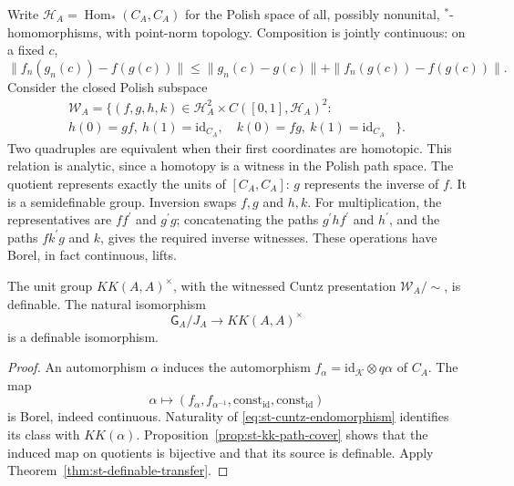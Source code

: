 Write $\mathcal{H}_A=\operatorname{Hom}_*(C_A,C_A)$ for the Polish space of all, possibly
nonunital, $^*$-homomorphisms, with point-norm topology. Composition is
jointly continuous: on a fixed $c$, 
\begin{equation*}
\|f_n(g_n(c))-f(g(c))\|  \leq\|g_n(c)-g(c)\|+\|f_n(g(c))-f(g(c))\|. 
\end{equation*}
Consider the closed Polish subspace 
\begin{equation}  \label{eq:st-unit-witnesses}
\begin{split}
\mathcal{W}_A=\{(f,g,h,k)\in \mathcal{H}_A^2\times C([0,1],\mathcal{H}_A)^2:\quad& \\
h(0)=gf,\ h(1)=\mathrm{id}_{C_A},\quad k(0)=fg,\ k(1)=\mathrm{id}_{C_A}&\}.
\end{split}\end{equation}
Two quadruples are equivalent when their first coordinates are homotopic.
This relation is analytic, since a homotopy is a witness in the Polish path
space. The quotient represents exactly the units of $[C_A,C_A]$: $g$
represents the inverse of $f$. It is a semidefinable group. Inversion swaps $f,g$ and $h,k$. For multiplication, the representatives are $ff^{\prime }$
and $g^{\prime }g$; concatenating the paths $g^{\prime }hf^{\prime }$ and $h^{\prime }$, and the paths $fk^{\prime }g$ and $k$, gives the required
inverse witnesses. These operations have Borel, in fact continuous, lifts.

\begin{proposition}\label{prop:st-definable-kk-units}
 The unit group $KK(A,A)^\times$, with the
witnessed Cuntz presentation $\mathcal{W}_A/{\sim}$, is definable. The
natural isomorphism 
\begin{equation*}
\mathsf G_A/J_A\longrightarrow KK(A,A)^\times 
\end{equation*}
is a definable isomorphism.
\end{proposition}

\begin{proof}
An automorphism $\alpha$ induces the automorphism $f_\alpha=\mathrm{id}_{\mathcal{K}}\otimes q\alpha$ of $C_A$. The map 
\begin{equation*}
\alpha\longmapsto  (f_\alpha,f_{\alpha^{-1}},\mathrm{const}_{\mathrm{id}},  
\mathrm{const}_{\mathrm{id}}) 
\end{equation*}
is Borel, indeed continuous. Naturality of \eqref{eq:st-cuntz-endomorphism}
identifies its class with $KK(\alpha)$. Proposition~\ref{prop:st-kk-path-cover}
shows that the induced map on quotients is bijective and that its source is
definable. Apply Theorem~\ref{thm:st-definable-transfer}.
\end{proof}

